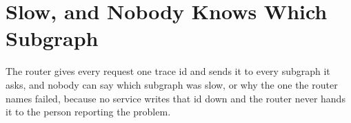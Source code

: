 \chapter{Slow, and Nobody Knows Which Subgraph}
\label{ch:blame-routing}

The router gives every request one trace id and sends it to every subgraph it
asks, and nobody can say which subgraph was slow, or why the one the router names
failed, because no service writes that id down and the router never hands it to the person
reporting the problem.







